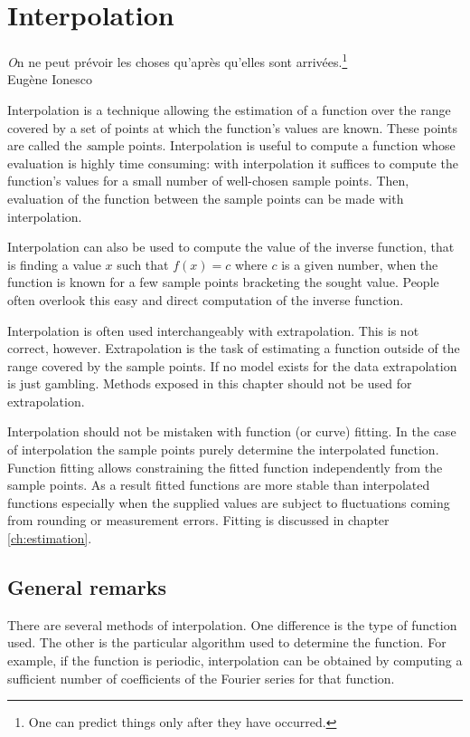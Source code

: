 %
%

\chapter{Interpolation}
\label{ch:interpolation}
\begin{flushright}
{\textsl On ne peut pr\'evoir les choses qu'apr\`es qu'elles sont
arriv\'ees.}\footnote{One can predict things only after they have
occurred.}\\ Eug\`ene Ionesco
\end{flushright}
\vspace{1 ex} Interpolation is a technique allowing the estimation
of a function over the range covered by a set of points at which
the function's values are known. These points are called the {\textsl
sample} points. Interpolation is useful to compute a function
whose evaluation is highly time consuming: with interpolation it
suffices to compute the function's values for a small number of
well-chosen sample points. Then, evaluation of the function
between the sample points can be made with interpolation.

Interpolation can also be used to compute the value of the inverse
function, that is finding a value $x$ such that
$f\left(x\right)=c$ where $c$ is a given number, when the function
is known for a few sample points bracketing the sought value.
People often overlook this easy and direct computation of the
inverse function.

Interpolation is often used interchangeably with extrapolation.
This is not correct, however. Extrapolation is the task of
estimating a function outside of the range covered by the sample
points. If no model exists for the data extrapolation is just
gambling. Methods exposed in this chapter should not be used for
extrapolation.

Interpolation should not be mistaken with function (or curve)
fitting. In the case of interpolation the sample points purely
determine the interpolated function. Function fitting allows
constraining the fitted function independently from the sample
points. As a result fitted functions are more stable than
interpolated functions especially when the supplied values are
subject to fluctuations coming from rounding or measurement
errors. Fitting is discussed in chapter \ref{ch:estimation}.

\section{General remarks}
\label{sec:interpolgen} There are several methods of
interpolation. One difference is the type of function used. The
other is the particular algorithm used to determine the function.
For example, if the function is periodic, interpolation can be
obtained by computing a sufficient number of coefficients of the
Fourier series for that function.

